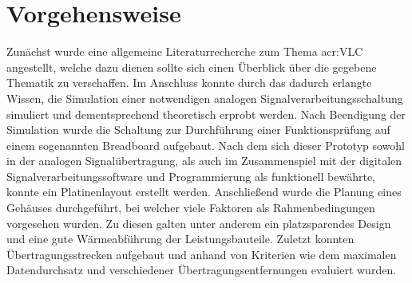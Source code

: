 \section{Vorgehensweise}
\label{sec:method}
Zunächst wurde eine allgemeine Literaturrecherche zum Thema \gls{acr:VLC} angestellt, welche dazu dienen sollte sich einen Überblick über die gegebene Thematik zu verschaffen. Im Anschluss konnte durch das dadurch erlangte Wissen, die Simulation einer notwendigen analogen Signalverarbeitungsschaltung simuliert und dementsprechend theoretisch erprobt werden. Nach Beendigung der Simulation wurde die Schaltung zur Durchführung einer Funktionsprüfung auf einem sogenannten Breadboard aufgebaut. Nach dem sich dieser Prototyp sowohl in der analogen Signalübertragung, als auch im Zusammenspiel mit der digitalen Signalverarbeitungssoftware und Programmierung als funktionell bewährte, konnte ein Platinenlayout erstellt werden. Anschließend wurde die Planung eines Gehäuses durchgeführt, bei welcher viele Faktoren als Rahmenbedingungen vorgesehen wurden. Zu diesen galten unter anderem ein platzsparendes Design und eine gute Wärmeabführung der Leistungsbauteile. Zuletzt konnten Übertragungsstrecken aufgebaut und anhand von Kriterien wie dem maximalen Datendurchsatz und verschiedener Übertragungsentfernungen evaluiert wurden. 

